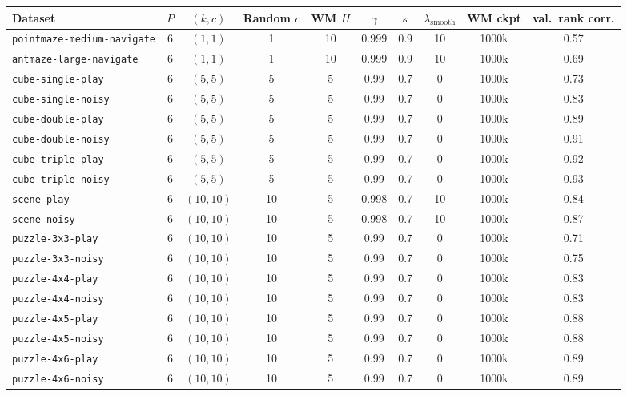 \begin{tabular}{lccccccccc}
\toprule
Dataset & $P$ & $(k,c)$ & Random $c$ & WM $H$ & $\gamma$ & $\kappa$ & $\lambda_{\mathrm{smooth}}$ & WM ckpt & val.\ rank corr. \\
\midrule
\texttt{pointmaze-medium-navigate} & 6 & $(1,1)$ & 1 & 10 & 0.999 & 0.9 & 10 & 1000k & 0.57 \\
\texttt{antmaze-large-navigate} & 6 & $(1,1)$ & 1 & 10 & 0.999 & 0.9 & 10 & 1000k & 0.69 \\
\texttt{cube-single-play} & 6 & $(5,5)$ & 5 & 5 & 0.99 & 0.7 & 0 & 1000k & 0.73 \\
\texttt{cube-single-noisy} & 6 & $(5,5)$ & 5 & 5 & 0.99 & 0.7 & 0 & 1000k & 0.83 \\
\texttt{cube-double-play} & 6 & $(5,5)$ & 5 & 5 & 0.99 & 0.7 & 0 & 1000k & 0.89 \\
\texttt{cube-double-noisy} & 6 & $(5,5)$ & 5 & 5 & 0.99 & 0.7 & 0 & 1000k & 0.91 \\
\texttt{cube-triple-play} & 6 & $(5,5)$ & 5 & 5 & 0.99 & 0.7 & 0 & 1000k & 0.92 \\
\texttt{cube-triple-noisy} & 6 & $(5,5)$ & 5 & 5 & 0.99 & 0.7 & 0 & 1000k & 0.93 \\
\texttt{scene-play} & 6 & $(10,10)$ & 10 & 5 & 0.998 & 0.7 & 10 & 1000k & 0.84 \\
\texttt{scene-noisy} & 6 & $(10,10)$ & 10 & 5 & 0.998 & 0.7 & 10 & 1000k & 0.87 \\
\texttt{puzzle-3x3-play} & 6 & $(10,10)$ & 10 & 5 & 0.99 & 0.7 & 0 & 1000k & 0.71 \\
\texttt{puzzle-3x3-noisy} & 6 & $(10,10)$ & 10 & 5 & 0.99 & 0.7 & 0 & 1000k & 0.75 \\
\texttt{puzzle-4x4-play} & 6 & $(10,10)$ & 10 & 5 & 0.99 & 0.7 & 0 & 1000k & 0.83 \\
\texttt{puzzle-4x4-noisy} & 6 & $(10,10)$ & 10 & 5 & 0.99 & 0.7 & 0 & 1000k & 0.83 \\
\texttt{puzzle-4x5-play} & 6 & $(10,10)$ & 10 & 5 & 0.99 & 0.7 & 0 & 1000k & 0.88 \\
\texttt{puzzle-4x5-noisy} & 6 & $(10,10)$ & 10 & 5 & 0.99 & 0.7 & 0 & 1000k & 0.88 \\
\texttt{puzzle-4x6-play} & 6 & $(10,10)$ & 10 & 5 & 0.99 & 0.7 & 0 & 1000k & 0.89 \\
\texttt{puzzle-4x6-noisy} & 6 & $(10,10)$ & 10 & 5 & 0.99 & 0.7 & 0 & 1000k & 0.89 \\
\bottomrule
\end{tabular}
